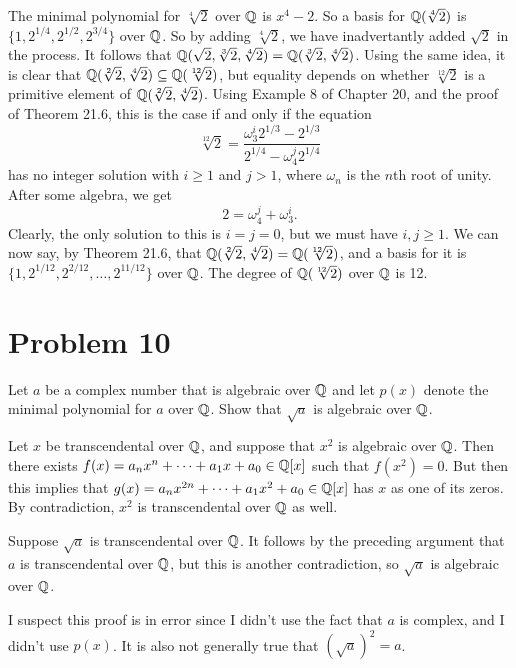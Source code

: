 \documentclass{article}
\begin{document}
The minimal polynomial for $\sqrt[4]{2}$ over $\mathbb{Q}$ is $x^4-2$.  So a basis
for $\mathbb{Q}(\sqrt[4]{2})$ is $\{1,2^{1/4},2^{1/2},2^{3/4}\}$ over $\mathbb{Q}$.  So by
adding $\sqrt[4]{2}$, we have inadvertantly added $\sqrt{2}$ in the process.
It follows that $\mathbb{Q}(\sqrt{2},\sqrt[3]{2},\sqrt[4]{2})=\mathbb{Q}(\sqrt[3]{2},\sqrt[4]{2})$.
Using the same idea, it is clear that $\mathbb{Q}(\sqrt[2]{2},\sqrt[4]{2})\subseteq\mathbb{Q}(\sqrt[12]{2})$,
but equality depends on whether $\sqrt[12]{2}$ is a primitive element of
$\mathbb{Q}(\sqrt[2]{2},\sqrt[4]{2})$.  Using Example 8 of Chapter 20, and the proof of Theorem 21.6,
this is the case if and only if the equation
\begin{equation*}
\sqrt[12]{2}=\frac{\omega_3^i2^{1/3}-2^{1/3}}{2^{1/4}-\omega_4^j2^{1/4}}
\end{equation*}
has no integer solution with $i\geq 1$ and $j>1$, where $\omega_n$ is the
$n$th root of unity.  After some algebra, we get
\begin{equation*}
2=\omega_4^j+\omega_3^i.
\end{equation*}
Clearly, the only solution to this is $i=j=0$, but we must have $i,j\geq 1$.
We can now say, by Theorem 21.6, that $\mathbb{Q}(\sqrt[2]{2},\sqrt[4]{2})=\mathbb{Q}(\sqrt[12]{2})$,
and a basis for it is $\{1,2^{1/12},2^{2/12},\dots,2^{11/12}\}$ over $\mathbb{Q}$.
The degree of $\mathbb{Q}(\sqrt[12]{2})$ over $\mathbb{Q}$ is 12.

\pagebreak
\section*{Problem 10}

Let $a$ be a complex number that is algebraic over $\mathbb{Q}$ and let $p(x)$
denote the minimal polynomial for $a$ over $\mathbb{Q}$.  Show that $\sqrt{a}$
is algebraic over $\mathbb{Q}$.

Let $x$ be transcendental over $\mathbb{Q}$, and suppose that $x^2$ is algebraic
over $\mathbb{Q}$.  Then there exists $f(x)=a_nx^n+\dots+a_1x+a_0\in\mathbb{Q}[x]$ such
that $f(x^2)=0$.  But then this implies that $g(x)=a_nx^{2n}+\dots+a_1x^2+a_0\in\mathbb{Q}[x]$
has $x$ as one of its zeros.  By contradiction, $x^2$ is transcendental over
$\mathbb{Q}$ as well.

Suppose $\sqrt{a}$ is transcendental over $\mathbb{Q}$.  It follows by the preceding argument
that $a$ is transcendental over $\mathbb{Q}$, but this is another contradiction, so
$\sqrt{a}$ is algebraic over $\mathbb{Q}$.

I suspect this proof is in error since I didn't use the fact that $a$ is complex,
and I didn't use $p(x)$.  It is also not generally true that $(\sqrt{a})^2=a$.
\end{document}
